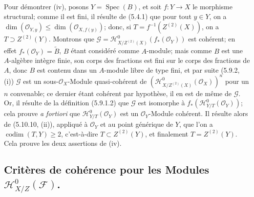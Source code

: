 Pour démontrer (iv), posons $Y=\operatorname{Spec}(B)$, et soit $f:Y\to X$ le
morphisme structural; comme il est fini, il résulte de (5.4.1) que pour tout
$y\in Y$, on a
$\dim(\mathcal O_{Y,y})\leq\dim(\mathcal O_{X,f(y)})$; donc, si
$T=f^{-1}(Z^{(2)}(X))$, on a $T\supset Z^{(2)}(Y)$. Montrons que
$\mathcal G=\mathcal H^0_{X/Z^{(2)}(X)}(f_*(\mathcal O_Y))$
est cohérent; en effet $f_*(\mathcal O_Y)=\widetilde B$, $B$ étant considéré
comme $A$-module; mais comme $B$ est une $A$-algèbre intègre finie, son corps
des fractions est fini sur le corps des fractions de $A$, donc $B$ est contenu
dans un $A$-module libre de type fini, et par suite (5.9.2, (i)) $\mathcal G$
est un sous-$\mathcal O_X$-Module quasi-cohérent de
$(\mathcal H^0_{X/Z^{(2)}(X)}(\mathcal O_X))^n$ pour un $n$ convenable; ce
dernier étant cohérent par hypothèse, il en est de même de $\mathcal G$. Or,
il résulte de la définition (5.9.1.2) que $\mathcal G$ est isomorphe à
$f_*(\mathcal H^0_{Y/T}(\mathcal O_Y))$; cela prouve \emph{a fortiori} que
$\mathcal H^0_{Y/T}(\mathcal O_Y)$ est un $\mathcal O_Y$-Module cohérent. Il
résulte alors de (5.10.10, (ii)), appliqué à $\mathcal O_Y$ et au point
générique de $Y$, que l'on a $\operatorname{codim}(T,Y)\geq2$, c'est-à-dire
$T\subset Z^{(2)}(Y)$, et finalement $T=Z^{(2)}(Y)$. Cela prouve les deux
assertions de (iv).


\subsection{\texorpdfstring{Critères de cohérence pour les Modules
$\mathcal H^0_{X/Z}(\mathcal F)$.}{Critères de cohérence pour les Modules H\string^0\string_(F)}}


